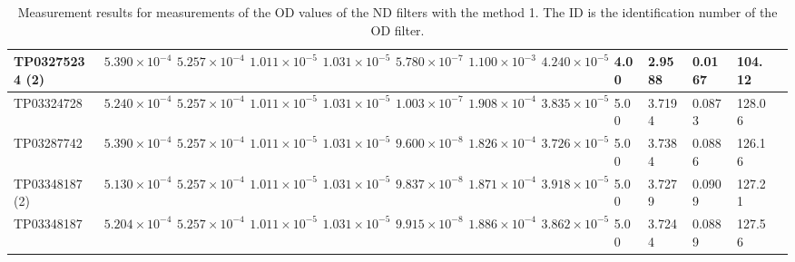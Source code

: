 \begin{table}[!hbt]
{\begin{tabular}{|l|l|l|l|l|l|l|l|l|l|l|l|l|}
        TP03275234 (2) & $5.390 \times 10^{-4}$ & $5.257 \times 10^{-4}$ & $1.011 \times 10^{-5}$ & $1.031 \times 10^{-5}$ & $5.780 \times 10^{-7}$ & $1.100 \times 10^{-3}$ & $4.240 \times 10^{-5}$ & 4.00 & 2.9588 & 0.0167 & 104.12 \\ \hline
        TP03324728 & $5.240 \times 10^{-4}$ & $5.257 \times 10^{-4}$ & $1.011 \times 10^{-5}$ & $1.031 \times 10^{-5}$ & $1.003 \times 10^{-7}$ & $1.908 \times 10^{-4}$ & $3.835 \times 10^{-5}$ & 5.00 & 3.7194 & 0.0873 & 128.06 \\ \hline
        TP03287742 & $5.390 \times 10^{-4}$ & $5.257 \times 10^{-4}$ & $1.011 \times 10^{-5}$ & $1.031 \times 10^{-5}$ & $9.600 \times 10^{-8}$ & $1.826 \times 10^{-4}$ & $3.726 \times 10^{-5}$ & 5.00 & 3.7384 & 0.0886 & 126.16 \\ \hline
        TP03348187 (2) & $5.130 \times 10^{-4}$ & $5.257 \times 10^{-4}$ & $1.011 \times 10^{-5}$ & $1.031 \times 10^{-5}$ & $9.837 \times 10^{-8}$ & $1.871 \times 10^{-4}$ & $3.918 \times 10^{-5}$ & 5.00 & 3.7279 & 0.0909 & 127.21 \\ \hline
        TP03348187 & $5.204 \times 10^{-4}$ & $5.257 \times 10^{-4}$ & $1.011 \times 10^{-5}$ & $1.031 \times 10^{-5}$ & $9.915 \times 10^{-8}$ & $1.886 \times 10^{-4}$ & $3.862 \times 10^{-5}$ & 5.00 & 3.7244 & 0.0889 & 127.56 \\ \hline
    \end{tabular}%
    }
    \caption{Measurement results for measurements of the OD values of the ND filters with the method 1. The ID is the identification number of the OD filter.}
    \label{tab:measurement_results}
\end{table}